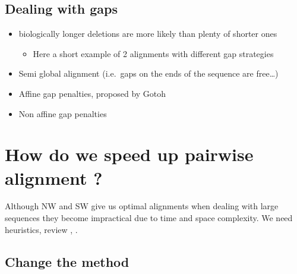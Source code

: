 \documentclass[
  11pt,
  twoside]{scrbook}
\providecommand{\tightlist}{%
  \setlength{\itemsep}{0pt}\setlength{\parskip}{0pt}}
\begin{document}
\hypertarget{dealing-with-gaps}{%
\subsection{Dealing with gaps}\label{dealing-with-gaps}}

\begin{itemize}
\item
  biologically longer deletions are more likely than plenty of shorter ones

  \begin{itemize}
  \tightlist
  \item
    Here a short example of 2 alignments with different gap strategies
  \end{itemize}
\item
  Semi global alignment (i.e.~gaps on the ends of the sequence are free\ldots)
\item
  Affine gap penalties, proposed by Gotoh \autocite{gotohImprovedAlgorithmMatching1982}
\item
  Non affine gap penalties \autocite{bennerEmpiricalStructuralModels1993,guSizeDistributionInsertions1995,watermanEfficientSequenceAlignment1984}
\end{itemize}

\hypertarget{how-do-we-speed-up-pairwise-alignment}{%
\section{How do we speed up pairwise alignment ?}\label{how-do-we-speed-up-pairwise-alignment}}

Although NW and SW give us optimal alignments \autocite{pearson27DynamicProgramming1992} when dealing with large sequences they become impractical due to time and space complexity. We need heuristics, review \autocite{chaoDevelopmentsAlgorithmsSequence2022}, .

\hypertarget{change-the-method}{%
\subsection{Change the method}\label{change-the-method}}
\end{document}
